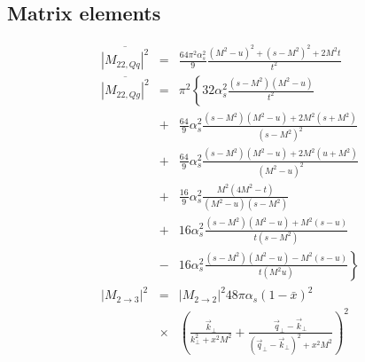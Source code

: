 \documentclass[aps, prc, reprint, amsmath, groupedaddress, nofootinbib]{revtex4-1}
\begin{document}
\begin{appendices}

\section{Matrix elements}
\label{appendix:matrix-element}
\begin{eqnarray}
\overline{|M_{22,Qq}|^2} &=& \frac{64\pi^2\alpha_s^2}{9} \frac{(M^2-u)^2 + (s-M^2)^2 + 2 M^2 t}{t^2}
\nonumber
\\
\overline{|M_{22,Qg}|^2} &=& \pi^2 \left\{
32\alpha_s^2 \frac{(s-M^2)(M^2-u)}{t^2} \right.
\nonumber
\\
&+&\frac{64}{9}\alpha_s^2 \frac{(s-M^2)(M^2-u)+2M^2(s+M^2)}{(s-M^2)^2} \nonumber
\\
&+&\frac{64}{9}\alpha_s^2 \frac{(s-M^2)(M^2-u)+2M^2(u+M^2)}{(M^2-u)^2} \nonumber
\\
&+& \frac{16}{9}\alpha_s^2 \frac{M^2(4M^2 - t)}{(M^2-u)(s-M^2)} 
\nonumber
\\
&+& 16 \alpha_s^2 \frac{(s-M^2)(M^2-u)+M^2(s-u)}{t(s-M^2)}
\nonumber
\\
&-& \left. 16 \alpha_s^2 \frac{(s-M^2)(M^2-u)-M^2(s-u)}{t(M^2u)}\right\}
\nonumber
\\
|M_{2\rightarrow 3}|^2 &=& |M_{2\rightarrow 2}|^2 48 \pi \alpha_s (1-\bar{x})^2
\nonumber
\\
&\times&\left(\frac{\vec{k}_\perp}{k_\perp^2 + x^2 M^2} + \frac{\vec{q}_\perp - \vec{k}_\perp}{(\vec{q}_\perp-\vec{k}_\perp)^2 + x^2 M^2}
\right)^2 
\end{eqnarray}


\end{appendices}
\end{document}
